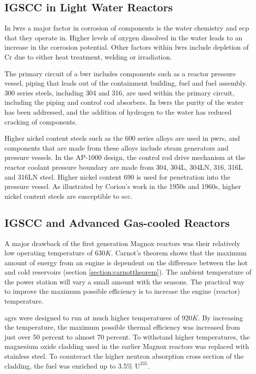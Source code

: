\FloatBarrier

\subsection{IGSCC in Light Water Reactors}

In \acrshort{lwr}s a major factor in corrosion of components is the water chemistry and \acrlong{ecp} that they operate in.  Higher levels of oxygen dissolved in the water leads to an increase in the corrosion potential\cite{wasstrucaustenitic}.  Other factors within \acrshort{lwr}s include depletion of Cr due to either heat treatment, welding or irradiation.

The primary circuit of a \acrshort{bwr} includes components such as a reactor pressure vessel, piping that leads out of the containment building, fuel and fuel assembly.  300 series steels, including 304 and 316, are used within the primary circuit, including the piping and control cod absorbers.  In \acrshort{bwr}s the purity of the water has been addressed, and the addition of hydrogen to the water has reduced cracking of components\cite{staehlecoriou}.  

Higher nickel content steels such as the 600 series alloys are used in \acrshort{pwr}s, and components that are made from these alloys include steam generators and pressure vessels.  In the AP-1000 design, the control rod drive mechanism at the reactor coolant pressure boundary are made from 304, 304L, 304LN, 316, 316L and 316LN steel.  Higher nickel content 690 is used for penetration into the pressure vessel\cite{ap1000dcd}.  As illustrated by Coriou's work in the 1950s and 1960s, higher nickel content steels are susceptible to \acrlong{scc}.

\FloatBarrier
\subsection{IGSCC and Advanced Gas-cooled Reactors}

A major drawback of the first generation Magnox reactors was their relatively low operating temperature of $630K$.  Carnot's theorem shows that the maximum amount of energy from an engine is dependent on the difference between the hot and cold reservoirs (section \ref{section:carnottheorem}).  The ambient temperature of the power station will vary a small amount with the seasons.  The practical way to improve the maximum possible efficiency is to increase the engine (reactor) temperature.

\acrshort{agr}s were designed to run at much higher temperatures of $920K$.  By increasing the temperature, the maximum possible thermal efficiency was increased from just over 50 percent to almost 70 percent.  To withstand higher temperatures, the magnesium oxide cladding used in the earlier Magnox reactors was replaced with stainless steel.  To counteract the higher neutron absorption cross section of the cladding, the fuel was enriched up to 3.5\% $\text{U}^{235}$.

